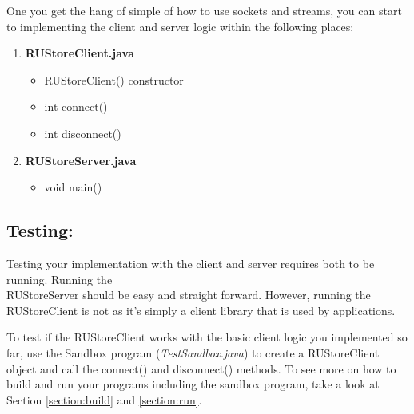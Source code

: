 \documentclass{article}
\begin{document}
\noindent One you get the hang of simple of how to use sockets and streams, you can start to implementing the client and server logic within the following places:

\begin{enumerate}
    \item \textbf{RUStoreClient.java}
        \begin{itemize}
            \item RUStoreClient() constructor
            \item int connect()
            \item int disconnect()
        \end{itemize}
    \item \textbf{RUStoreServer.java}
        \begin{itemize}
            \item void main()
        \end{itemize}
\end{enumerate}



\subsection*{Testing:}
Testing your implementation with the client and server requires both to be running. Running the\\ RUStoreServer should be easy and straight forward. However, running the RUStoreClient is not as it's simply a client library that is used by applications. 

To test if the RUStoreClient works with the basic client logic you implemented so far, use the Sandbox program (\textit{TestSandbox.java}) to create a RUStoreClient object and call the connect() and disconnect() methods. To see more on how to build and run your programs including the sandbox program, take a look at Section \ref{section:build} and \ref{section:run}.
\end{document}
